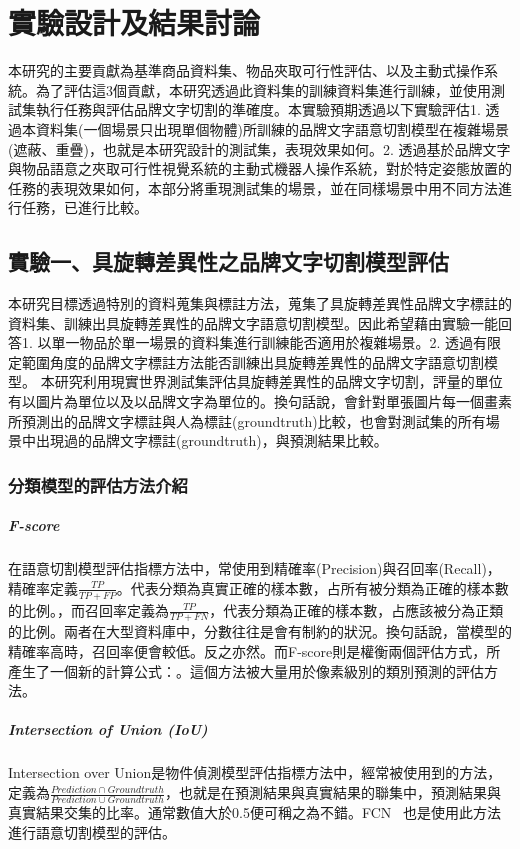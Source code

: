\chapter{實驗設計及結果討論}
\label{chapter:experiment}

本研究的主要貢獻為基準商品資料集、物品夾取可行性評估、以及主動式操作系統。為了評估這3個貢獻，本研究透過此資料集的訓練資料集進行訓練，並使用測試集執行任務與評估品牌文字切割的準確度。本實驗預期透過以下實驗評估1. 透過本資料集(一個場景只出現單個物體)所訓練的品牌文字語意切割模型在複雜場景(遮蔽、重疊)，也就是本研究設計的測試集，表現效果如何。2. 透過基於品牌文字與物品語意之夾取可行性視覺系統的主動式機器人操作系統，對於特定姿態放置的任務的表現效果如何，本部分將重現測試集的場景，並在同樣場景中用不同方法進行任務，已進行比較。

\section{實驗一、具旋轉差異性之品牌文字切割模型評估}
本研究目標透過特別的資料蒐集與標註方法，蒐集了具旋轉差異性品牌文字標註的資料集、訓練出具旋轉差異性的品牌文字語意切割模型。因此希望藉由實驗一能回答1. 以單一物品於單一場景的資料集進行訓練能否適用於複雜場景。2. 透過有限定範圍角度的品牌文字標註方法能否訓練出具旋轉差異性的品牌文字語意切割模型。
本研究利用現實世界測試集評估具旋轉差異性的品牌文字切割，評量的單位有以圖片為單位以及以品牌文字為單位的。換句話說，會針對單張圖片每一個畫素所預測出的品牌文字標註與人為標註(groundtruth)比較，也會對測試集的所有場景中出現過的品牌文字標註(groundtruth)，與預測結果比較。


\subsection{分類模型的評估方法介紹}

\paragraph{F-score}
在語意切割模型評估指標方法中，常使用到精確率(Precision)與召回率(Recall)，精確率定義$\frac{TP}{TP + FP}$。代表分類為真實正確的樣本數，占所有被分類為正確的樣本數的比例。，而召回率定義為$\frac{TP}{TP + FN}$，代表分類為正確的樣本數，占應該被分為正類的比例。兩者在大型資料庫中，分數往往是會有制約的狀況。換句話說，當模型的精確率高時，召回率便會較低。反之亦然。而F-score則是權衡兩個評估方式，所產生了一個新的計算公式：。這個方法被大量用於像素級別的類別預測的評估方法。

\paragraph{Intersection of Union (IoU)}
Intersection over Union是物件偵測模型評估指標方法中，經常被使用到的方法，定義為$\frac{Prediction \cap  Groundtruth}{Prediction \cup  Groundtruth}$，也就是在預測結果與真實結果的聯集中，預測結果與真實結果交集的比率。通常數值大於0.5便可稱之為不錯。FCN ~\cite{long2015fully}也是使用此方法進行語意切割模型的評估。

